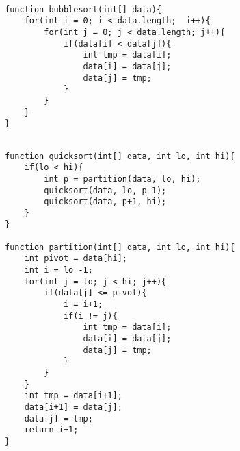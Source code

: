 \begin{minipage}[t]{0.45\linewidth}
\begin{lstlisting}[label={8_bubblesort},caption={Bubblesort}]
	
function bubblesort(int[] data){
	for(int i = 0; i < data.length;  i++){
		for(int j = 0; j < data.length; j++){
			if(data[i] < data[j]){
				int tmp = data[i];
				data[i] = data[j];
				data[j] = tmp;
			}
		}
	}
}

\end{lstlisting}
\end{minipage}
%
\begin{minipage}[t]{0.45\linewidth}
\begin{lstlisting}[label={8_quicksort}, caption={Quicksort}]
	
function quicksort(int[] data, int lo, int hi){
	if(lo < hi){
		int p = partition(data, lo, hi);
		quicksort(data, lo, p-1);
		quicksort(data, p+1, hi);
	}
}

function partition(int[] data, int lo, int hi){
	int pivot = data[hi];
	int i = lo -1;
	for(int j = lo; j < hi; j++){
		if(data[j] <= pivot){
			i = i+1;
			if(i != j){
				int tmp = data[i];
				data[i] = data[j];
				data[j] = tmp;
			}
		}
	}
	int tmp = data[i+1];
	data[i+1] = data[j];
	data[j] = tmp;
	return i+1;
}

\end{lstlisting}
\end{minipage}



